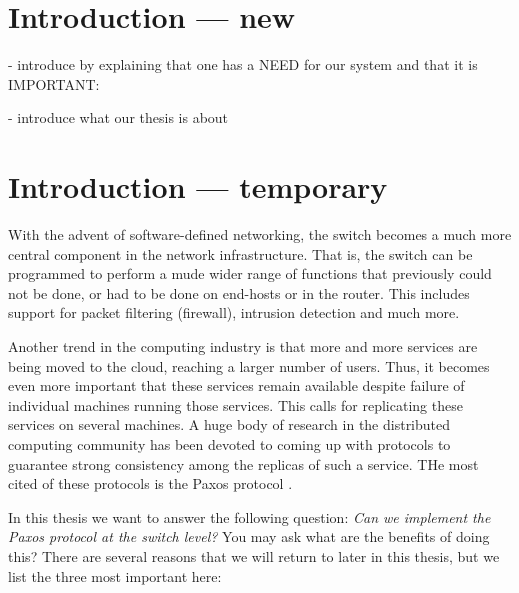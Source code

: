 \chapter{Introduction --- new}

- introduce by explaining that one has a NEED for our system and that it is
IMPORTANT:

- introduce what our thesis is about


\chapter{Introduction --- temporary}

With the advent of software-defined networking, the switch becomes a much
more central component in the network infrastructure.
%
That is, the switch can be programmed to perform a mude wider range of
functions that previously could not be done, or had to be done on end-hosts
or in the router.
%
This includes support for packet filtering (firewall), intrusion detection
and much more.


Another trend in the computing industry is that more and more services are
being moved to the cloud, reaching a larger number of users.
%
Thus, it becomes even more important that these services remain available
despite failure of individual machines running those services.
%
This calls for replicating these services on several machines.
%
A huge body of research in the distributed computing community has been
devoted to coming up with protocols to guarantee strong consistency among
the replicas of such a service.
%
THe most cited of these protocols is the Paxos protocol \cite{Lam01}.
%

In this thesis we want to answer the following question: \textit{Can we
implement the Paxos protocol at the switch level?}
%
You may ask what are the benefits of doing this?
%
There are several reasons that we will return to later in this thesis, but
we list the three most important here:


